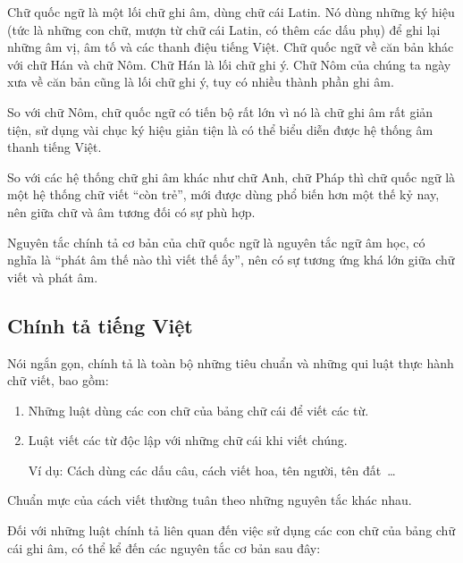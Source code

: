 \documentclass[a4paper,oneside]{book} %
\theoremstyle{break}
\begin{document}

Chữ quốc ngữ là một lối chữ ghi âm, dùng chữ cái Latin. Nó dùng những
ký hiệu (tức là những con chữ, mượn từ chữ cái Latin, có thêm các dấu
phụ) để ghi lại những âm vị, âm tố và các thanh điệu tiếng Việt. Chữ
quốc ngữ về căn bản khác với chữ Hán và chữ Nôm. Chữ Hán là lối chữ
ghi ý. Chữ Nôm của chúng ta ngày xưa về căn bản cũng là lối chữ ghi ý,
tuy có nhiều thành phần ghi âm.

So với chữ Nôm, chữ quốc ngữ có tiến bộ rất lớn vì nó là chữ ghi âm
rất giản tiện, sử dụng vài chục ký hiệu giản tiện là có thể biểu diễn
được hệ thống âm thanh tiếng Việt.

So với các hệ thống chữ ghi âm khác như chữ Anh, chữ Pháp thì chữ quốc
ngữ là một hệ thống chữ viết ``còn trẻ'', mới được dùng phổ biến hơn
một thế kỷ nay, nên giữa chữ và âm tương đối có sự phù hợp.

Nguyên tắc chính tả cơ bản của chữ quốc ngữ là nguyên tắc ngữ âm học,
có nghĩa là ``phát âm thế nào thì viết thế ấy'', nên có sự tương ứng
khá lớn giữa chữ viết và phát âm.





\subsection{Chính tả tiếng Việt}

Nói ngắn gọn, chính tả là toàn bộ những tiêu chuẩn và những qui luật
thực hành chữ viết, bao gồm:
\begin{enumerate}
\item Những luật dùng các con chữ của bảng chữ cái để viết các từ.
\item Luật viết các từ độc lập với những chữ cái khi viết chúng.

  Ví dụ: Cách dùng các dấu câu, cách viết hoa, tên người, tên đất~\ldots 
\end{enumerate}

Chuẩn mực của cách viết thường tuân theo những nguyên tắc khác nhau.

Đối với những luật chính tả liên quan đến việc sử dụng các con
chữ của bảng chữ cái ghi âm, có thể kể đến các nguyên tắc cơ bản sau
đây:
\end{document}
